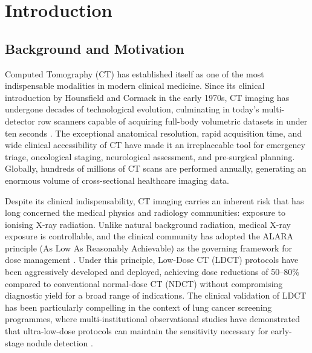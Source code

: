 
\chapter{Introduction}
\label{chap:introduction}

\section{Background and Motivation}
\label{sec:intro_background}

Computed Tomography (CT) has established itself as one of the most indispensable modalities
in modern clinical medicine. Since its clinical introduction by Hounsfield and Cormack in
the early 1970s, CT imaging has undergone decades of technological evolution, culminating
in today's multi-detector row scanners capable of acquiring full-body volumetric datasets
in under ten seconds \cite{hounsfield1973}. The exceptional anatomical resolution, rapid
acquisition time, and wide clinical accessibility of CT have made it an irreplaceable tool
for emergency triage, oncological staging, neurological assessment, and pre-surgical
planning. Globally, hundreds of millions of CT scans are performed annually, generating an
enormous volume of cross-sectional healthcare imaging data.

Despite its clinical indispensability, CT imaging carries an inherent risk that has long
concerned the medical physics and radiology communities: exposure to ionising X-ray
radiation. Unlike natural background radiation, medical X-ray exposure is controllable,
and the clinical community has adopted the ALARA principle (As Low As Reasonably
Achievable) as the governing framework for dose management \cite{alara_ref}. Under this
principle, Low-Dose CT (LDCT) protocols have been aggressively developed and deployed,
achieving dose reductions of 50--80\% compared to conventional normal-dose CT (NDCT)
without compromising diagnostic yield for a broad range of indications. The clinical
validation of LDCT has been particularly compelling in the context of lung cancer screening
programmes, where multi-institutional observational studies have demonstrated that
ultra-low-dose protocols can maintain the sensitivity necessary for early-stage nodule
detection \cite{ldct_lung_screening}.

